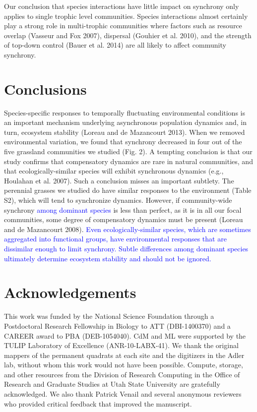 \documentclass[11pt,]{article}
\begin{document}
Our conclusion that species interactions have little impact on synchrony
only applies to single trophic level communities. Species interactions
almost certainly play a strong role in multi-trophic communities where
factors such as resource overlap (Vasseur and Fox 2007), dispersal
(Gouhier et al. 2010), and the strength of top-down control (Bauer et
al. 2014) are all likely to affect community synchrony.

\section{Conclusions}

Species-specific responses to temporally fluctuating environmental
conditions is an important mechanism underlying asynchronous population
dynamics and, in turn, ecosystem stability (Loreau and {{de Mazancourt}}
2013). When we removed environmental variation, we found that synchrony
decreased in four out of the five grassland communities we studied (Fig.
2). A tempting conclusion is that our study confirms that compensatory
dynamics are rare in natural communities, and that ecologically-similar
species will exhibit synchronous dynamics (e.g., Houlahan et al. 2007).
Such a conclusion misses an important subtlety. The perennial grasses we
studied do have similar responses to the environment (Table S2), which
will tend to synchronize dynamics. However, if community-wide synchrony
\textcolor{blue}{among dominant species} is less than perfect, as it is
in all our focal communities, some degree of compensatory dynamics must
be present (Loreau and {{de Mazancourt}} 2008).
\textcolor{blue}{Even ecologically-similar species, which are sometimes aggregated into functional groups, have environmental responses that are dissimilar enough to limit synchrony.
Subtle differences among dominant species ultimately determine ecosystem stability and should not be ignored.}

\section{Acknowledgements}

This work was funded by the National Science Foundation through a
Postdoctoral Research Fellowship in Biology to ATT (DBI-1400370) and a
CAREER award to PBA (DEB-1054040). CdM and ML were supported by the
TULIP Laboratory of Excellence (ANR-10-LABX-41). We thank the original
mappers of the permanent quadrats at each site and the digitizers in the
Adler lab, without whom this work would not have been possible. Compute,
storage, and other resources from the Division of Research Computing in
the Office of Research and Graduate Studies at Utah State University are
gratefully acknowledged. We also thank Patrick Venail and several
anonymous reviewers who provided critical feedback that improved the
manuscript.
\end{document}
